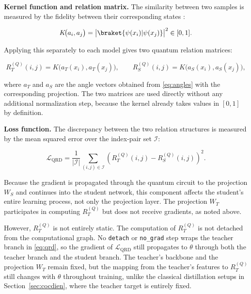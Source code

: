\textbf{Kernel function and relation matrix.} The similarity between
two samples is measured by the fidelity between their corresponding
states \cite{schuld2019quantum}:

\begin{equation}
\label{eq:kernel}
K\!\big(a_i, a_j\big) =
  \big| \braket{ \psi(x_i) | \psi(x_j) } \big|^{2} \in [0,1].
\end{equation}

Applying this separately to each model gives two quantum relation
matrices:

\begin{equation}
\label{eq:relmat}
R_T^{(Q)}(i,j) = K\!\big(a_T(x_i), a_T(x_j)\big),
\qquad
R_S^{(Q)}(i,j) = K\!\big(a_S(x_i), a_S(x_j)\big),
\end{equation}

where $a_T$ and $a_S$ are the angle vectors obtained from
\eqref{eq:angles} with the corresponding projection. The two matrices
are used directly without any additional normalization step, because
the kernel already takes values in $[0,1]$ by definition.

\textbf{Loss function.} The discrepancy between the two relation
structures is measured by the mean squared error over the index-pair
set $\mathcal{I}$:

\begin{equation}
\label{eq:qrd}
\mathcal{L}_{\mathrm{QRD}} = \frac{1}{|\mathcal{I}|}
  \sum_{(i,j) \in \mathcal{I}}
  \left( R_T^{(Q)}(i,j) - R_S^{(Q)}(i,j) \right)^{2}.
\end{equation}

Because the gradient is propagated through the quantum circuit to
the projection $W_S$ and continues into the student network, this
component affects the student's entire learning process, not only
the projection layer. The projection $W_T$ participates in computing
$R_T^{(Q)}$ but does not receive gradients, as noted above.

However, $R_T^{(Q)}$ is not entirely static. The computation of
$R_T^{(Q)}$ is not detached from the computational graph. No
\texttt{detach} or \texttt{no\_grad} step wraps the teacher branch in
\eqref{eq:qrd}, so the gradient of $\mathcal{L}_{\mathrm{QRD}}$ still
propagates to $\theta$ through both the teacher branch and the
student branch. The teacher's backbone and the projection $W_T$
remain fixed, but the mapping from the teacher's features to
$R_T^{(Q)}$ still changes with $\theta$ throughout training, unlike
the classical distillation setups in Section~\ref{sec:cocdien}, where
the teacher target is entirely fixed.

